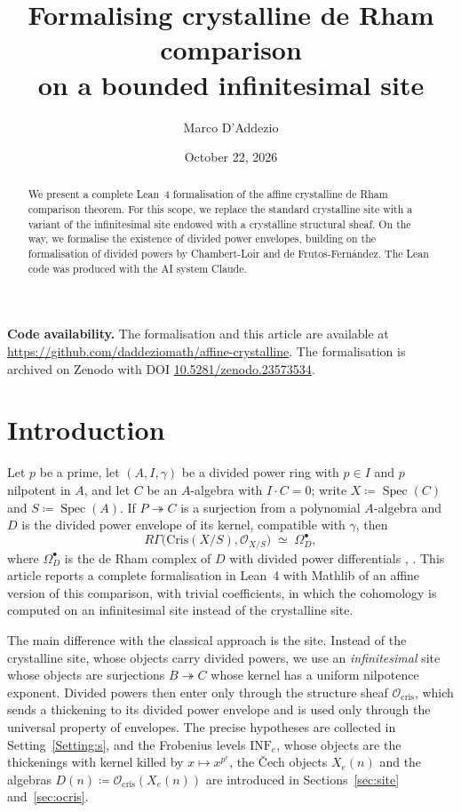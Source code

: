 \documentclass[11pt]{amsart}
\title{Formalising crystalline de Rham comparison\\ on a bounded infinitesimal site}
\author{Marco D'Addezio}
\date{October 22, 2026}
\newcommand{\spa}{\medskip}
\newcommand{\Ocris}{\mathcal{O}_{\mathrm{cris}}}
\DeclareMathOperator{\Spec}{Spec}
\newcommand{\INF}{\mathrm{INF}}
\newcommand{\repourl}{https://github.com/daddeziomath/affine-crystalline}
\theoremstyle{plain}
\theoremstyle{definition}
\theoremstyle{remark}
\begin{document}
\begin{abstract}
We present a complete Lean~4 formalisation of the affine crystalline de Rham comparison theorem. For this scope, we replace the standard crystalline site with a variant of the infinitesimal site endowed with a crystalline structural sheaf. On the way, we formalise the existence of divided power envelopes, building on the formalisation of divided powers by Chambert-Loir and de Frutos-Fernández. The Lean code was produced with the AI system Claude.
\end{abstract}

\maketitle

\noindent\textbf{Code availability.} The formalisation and this article are available at \expandafter\url\expandafter{\repourl}. The formalisation is archived on Zenodo with DOI \href{https://doi.org/10.5281/zenodo.23573534}{10.5281/zenodo.23573534}.

\setcounter{tocdepth}{1}
\tableofcontents

\section{Introduction}\label{sec:intro}

Let $p$ be a prime, let $(A, I, \gamma)$ be a divided power ring with $p \in I$ and $p$ nilpotent in $A$, and let $C$ be an $A$-algebra with $I \cdot C = 0$; write $X \coloneqq \Spec(C)$ and $S \coloneqq \Spec(A)$. If $P \twoheadrightarrow C$ is a surjection from a polynomial $A$-algebra and $D$ is the divided power envelope of its kernel, compatible with $\gamma$, then
\[
R\Gamma\big(\mathrm{Cris}(X/S), \mathcal{O}_{X/S}\big) \;\simeq\; \Omega^\bullet_{D},
\]
where $\Omega^\bullet_D$ is the de Rham complex of $D$ with divided power differentials \cite{berthelot,berthelot-ogus,bhatt-dejong}, \cite[Tag~07LG]{stacks}. This article reports a complete formalisation in Lean~4 with Mathlib \cite{mathlib} of an affine version of this comparison, with trivial coefficients, in which the cohomology is computed on an infinitesimal site instead of the crystalline site.

\spa

The main difference with the classical approach is the site. Instead of the crystalline site, whose objects carry divided powers, we use an \emph{infinitesimal} site whose objects are surjections $B \twoheadrightarrow C$ whose kernel has a uniform nilpotence exponent. Divided powers then enter only through the structure sheaf $\Ocris$, which sends a thickening to its divided power envelope and is used only through the universal property of envelopes. The precise hypotheses are collected in Setting~\ref{Setting:s}, and the Frobenius levels $\INF_e$, whose objects are the thickenings with kernel killed by $x \mapsto x^{p^e}$, the Čech objects $X_e(n)$ and the algebras $D(n) \coloneqq \Ocris(X_e(n))$ are introduced in Sections~\ref{sec:site} and~\ref{sec:ocris}.
\end{document}
